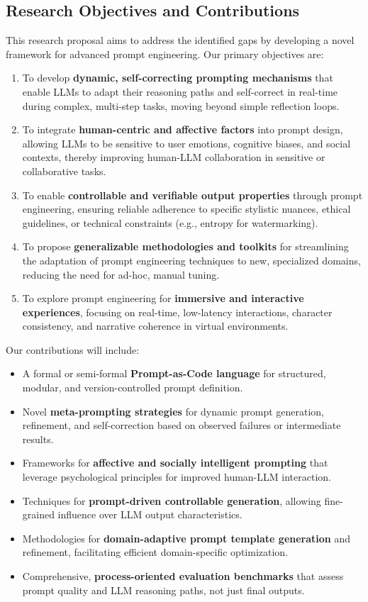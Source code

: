 \documentclass{article}
\begin{document}
\subsection{Research Objectives and Contributions}
This research proposal aims to address the identified gaps by developing a novel framework for advanced prompt engineering. Our primary objectives are:
\begin{enumerate}
    \item To develop \textbf{dynamic, self-correcting prompting mechanisms} that enable LLMs to adapt their reasoning paths and self-correct in real-time during complex, multi-step tasks, moving beyond simple reflection loops.
    \item To integrate \textbf{human-centric and affective factors} into prompt design, allowing LLMs to be sensitive to user emotions, cognitive biases, and social contexts, thereby improving human-LLM collaboration in sensitive or collaborative tasks.
    \item To enable \textbf{controllable and verifiable output properties} through prompt engineering, ensuring reliable adherence to specific stylistic nuances, ethical guidelines, or technical constraints (e.g., entropy for watermarking).
    \item To propose \textbf{generalizable methodologies and toolkits} for streamlining the adaptation of prompt engineering techniques to new, specialized domains, reducing the need for ad-hoc, manual tuning.
    \item To explore prompt engineering for \textbf{immersive and interactive experiences}, focusing on real-time, low-latency interactions, character consistency, and narrative coherence in virtual environments.
\end{enumerate}
Our contributions will include:
\begin{itemize}
    \item A formal or semi-formal \textbf{Prompt-as-Code language} for structured, modular, and version-controlled prompt definition.
    \item Novel \textbf{meta-prompting strategies} for dynamic prompt generation, refinement, and self-correction based on observed failures or intermediate results.
    \item Frameworks for \textbf{affective and socially intelligent prompting} that leverage psychological principles for improved human-LLM interaction.
    \item Techniques for \textbf{prompt-driven controllable generation}, allowing fine-grained influence over LLM output characteristics.
    \item Methodologies for \textbf{domain-adaptive prompt template generation} and refinement, facilitating efficient domain-specific optimization.
    \item Comprehensive, \textbf{process-oriented evaluation benchmarks} that assess prompt quality and LLM reasoning paths, not just final outputs.
\end{itemize}
\end{document}
